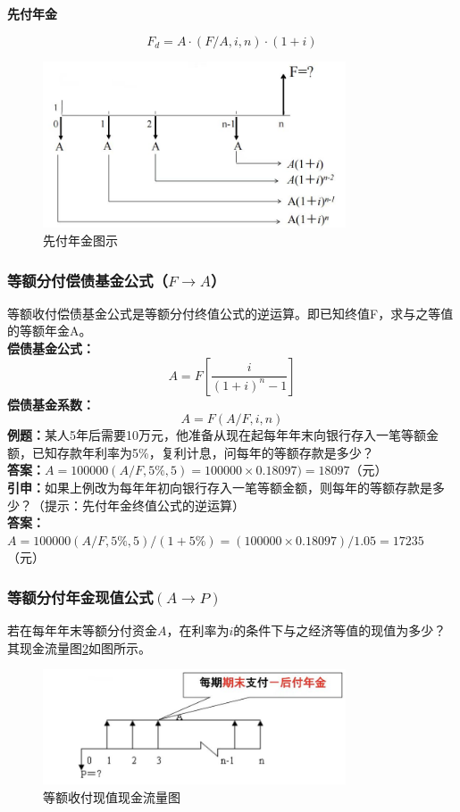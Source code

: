 \noindent \textbf{先付年金}

$$F_d= A \cdot ( F / A , i , n ) \cdot (1 + i)$$

\begin{figure}[H]
    \centering
    \includegraphics[width=0.8\textwidth]{image/先付年金图示.jpg}
    \caption{先付年金图示}
    \label{fig:8}
\end{figure}

\subsubsection{等额分付偿债基金公式（$F \to A$）}
等额收付偿债基金公式是等额分付终值公式的逆运算。即已知终值F，求与之等值的等额年金A。\\
\textbf{偿债基金公式：}
$$A=F[\frac{i}{(1+i)^n-1}]$$
\textbf{偿债基金系数：}
$$A = F ( A / F , i , n )$$
\textbf{例题：}某人5年后需要10万元，他准备从现在起每年年末向银行存入一笔等额金额，已知存款年利率为5\%，复利计息，问每年的等额存款是多少？\\
\textbf{答案：}$A=100000(A/F,5\%,5)=100000 \times 0.18097)=18097$（元）\\
\textbf{引申：}如果上例改为每年年初向银行存入一笔等额金额，则每年的等额存款是多少？（提示：先付年金终值公式的逆运算）\\
\textbf{答案：}$A=100000(A/F,5\%,5)/(1 + 5\%)= (100000 \times 0.18097)/1.05= 17235$（元）

\subsubsection{等额分付年金现值公式$(A \to P)$}
若在每年年末等额分付资金$A$，在利率为$i$的条件下与之经济等值的现值为多少？其现金流量图\ref{fig:9}如图所示。

\begin{figure}[H]
    \centering
    \includegraphics[width=0.8\textwidth]{image/等额收付现值现金流量图.jpg}
    \caption{等额收付现值现金流量图}
    \label{fig:9}
\end{figure}

